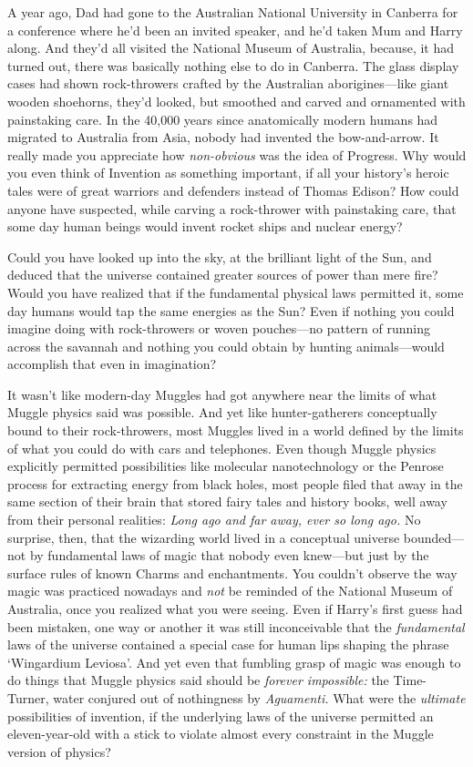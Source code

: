 A year ago, Dad had gone to the Australian National University in Canberra for a conference where he'd been an invited speaker, and he'd taken Mum and Harry along. And they'd all visited the National Museum of Australia, because, it had turned out, there was basically nothing else to do in Canberra. The glass display cases had shown rock-throwers crafted by the Australian aborigines—like giant wooden shoehorns, they'd looked, but smoothed and carved and ornamented with painstaking care. In the 40,000 years since anatomically modern humans had migrated to Australia from Asia, nobody had invented the bow-and-arrow. It really made you appreciate how \emph{non-obvious} was the idea of Progress. Why would you even think of Invention as something important, if all your history's heroic tales were of great warriors and defenders instead of Thomas Edison? How could anyone have suspected, while carving a rock-thrower with painstaking care, that some day human beings would invent rocket ships and nuclear energy?

Could you have looked up into the sky, at the brilliant light of the Sun, and deduced that the universe contained greater sources of power than mere fire? Would you have realized that if the fundamental physical laws permitted it, some day humans would tap the same energies as the Sun? Even if nothing you could imagine doing with rock-throwers or woven pouches—no pattern of running across the savannah and nothing you could obtain by hunting animals—would accomplish that even in imagination?

It wasn't like modern-day Muggles had got anywhere near the limits of what Muggle physics said was possible. And yet like hunter-gatherers conceptually bound to their rock-throwers, most Muggles lived in a world defined by the limits of what you could do with cars and telephones. Even though Muggle physics explicitly permitted possibilities like molecular nanotechnology or the Penrose process for extracting energy from black holes, most people filed that away in the same section of their brain that stored fairy tales and history books, well away from their personal realities: \emph{Long ago and far away, ever so long ago.} No surprise, then, that the wizarding world lived in a conceptual universe bounded—not by fundamental laws of magic that nobody even knew—but just by the surface rules of known Charms and enchantments. You couldn't observe the way magic was practiced nowadays and \emph{not} be reminded of the National Museum of Australia, once you realized what you were seeing. Even if Harry's first guess had been mistaken, one way or another it was still inconceivable that the \emph{fundamental} laws of the universe contained a special case for human lips shaping the phrase `Wingardium Leviosa'. And yet even that fumbling grasp of magic was enough to do things that Muggle physics said should be \emph{forever impossible:} the Time-Turner, water conjured out of nothingness by \emph{Aguamenti.} What were the \emph{ultimate} possibilities of invention, if the underlying laws of the universe permitted an eleven-year-old with a stick to violate almost every constraint in the Muggle version of physics?


